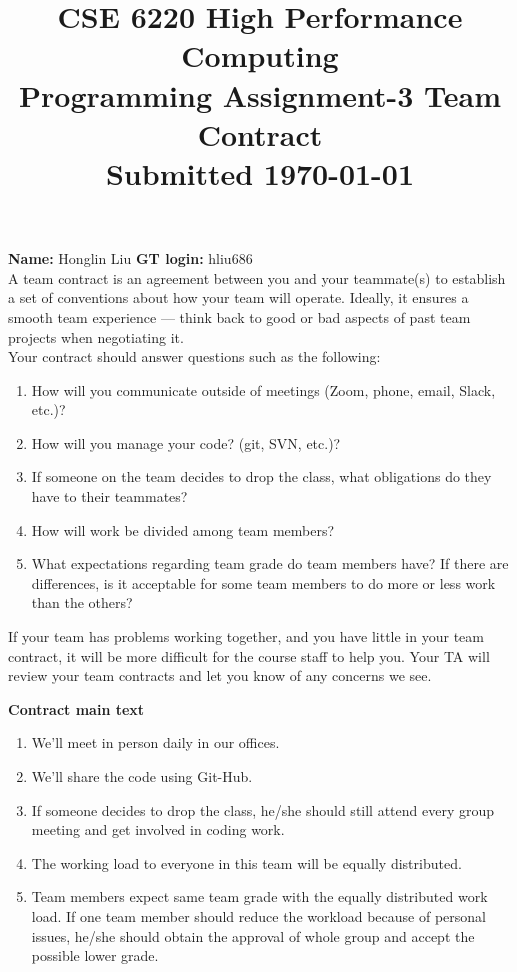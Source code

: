 \documentclass[11pt]{article}
\begin{document}
\title{\large\bf \vspace*{-0.3in}CSE 6220 High Performance Computing\\
Programming Assignment-3 Team Contract\\Submitted \today}
\author{}
\date{}
\maketitle
\vspace*{-0.8in}
{\bf Name:} Honglin Liu \hfill{{\bf GT login:} hliu686}\\

A team contract is an agreement between you and your teammate(s) to establish a set of conventions about how your team will operate. 
Ideally, it ensures a smooth team experience — think back to good or bad aspects of past team projects when negotiating it.\\

Your contract should answer questions such as the following:
\begin{enumerate}
	\item How will you communicate outside of meetings (Zoom, phone, email, Slack, etc.)?
	\item How will you manage your code? (git, SVN, etc.)?
	\item If someone on the team decides to drop the class, what obligations do they have to their teammates?
	\item How will work be divided among team members?
	\item What expectations regarding team grade do team members have? If there are differences, is it acceptable for some team members to do more or less work than the others?
\end{enumerate}

If your team has problems working together, and you have little in your team contract, it will be more difficult for the course staff to help you. Your TA will review your team contracts and let you know of any concerns we see.


\newpage
\textbf{Contract main text}
\begin{enumerate}
	\item We'll meet in person daily in our offices.
	\item We'll share the code using Git-Hub.
	\item If someone decides to drop the class, he/she should still attend every group meeting and get involved in coding work.
 	\item The working load to everyone in this team will be equally distributed.
 	\item Team members expect same team grade with the equally distributed work load. If one team member should reduce the workload because of personal issues, he/she should obtain the approval of whole group and accept the possible lower grade.

\end{enumerate}
\end{document}
